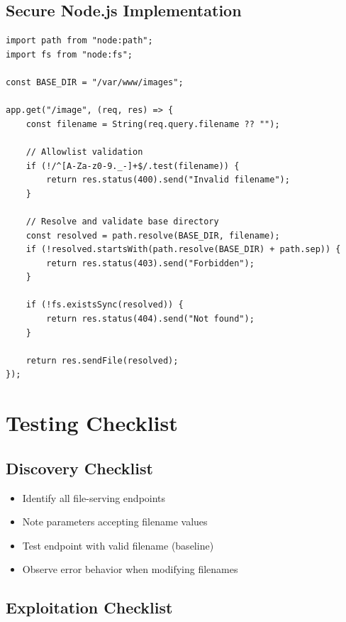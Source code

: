 \documentclass[11pt,letterpaper]{article}
\begin{document}
\subsection{Secure Node.js Implementation}

\begin{listing}[H]
\begin{verbatim}
import path from "node:path";
import fs from "node:fs";

const BASE_DIR = "/var/www/images";

app.get("/image", (req, res) => {
    const filename = String(req.query.filename ?? "");

    // Allowlist validation
    if (!/^[A-Za-z0-9._-]+$/.test(filename)) {
        return res.status(400).send("Invalid filename");
    }

    // Resolve and validate base directory
    const resolved = path.resolve(BASE_DIR, filename);
    if (!resolved.startsWith(path.resolve(BASE_DIR) + path.sep)) {
        return res.status(403).send("Forbidden");
    }

    if (!fs.existsSync(resolved)) {
        return res.status(404).send("Not found");
    }

    return res.sendFile(resolved);
});
\end{verbatim}
\caption{Node.js: Secure file serving}
\end{listing}

\section{Testing Checklist}

\subsection{Discovery Checklist}

\begin{itemize}[label=$\square$]
  \item Identify all file-serving endpoints
  \item Note parameters accepting filename values
  \item Test endpoint with valid filename (baseline)
  \item Observe error behavior when modifying filenames
\end{itemize}

\subsection{Exploitation Checklist}
\end{document}
